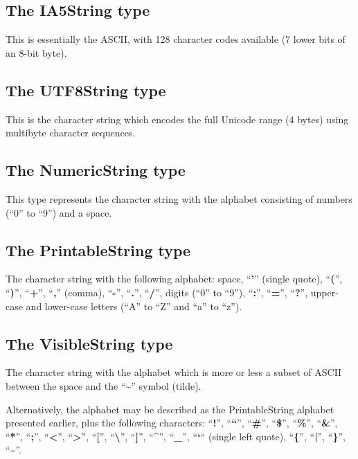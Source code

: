 \documentclass[english,oneside,12pt]{book}
\begin{document}
\subsection{The IA5String type}

This is essentially the ASCII, with 128 character codes available
(7 lower bits of an 8-bit byte).


\subsection{The UTF8String type}

This is the character string which encodes the full Unicode range
(4 bytes) using multibyte character sequences.


\subsection{The NumericString type}

This type represents the character string with the alphabet consisting
of numbers (``0'' to ``9'') and a space.


\subsection{The PrintableString type}

The character string with the following alphabet: space, ``\textbf{'}''
(single quote), ``\textbf{(}'', ``\textbf{)}'', ``\textbf{+}'',
``\textbf{,}'' (comma), ``\textbf{-}'', ``\textbf{.}'', ``\textbf{/}'',
digits (``0'' to ``9''), ``\textbf{:}'', ``\textbf{=}'', ``\textbf{?}'',
upper-case and lower-case letters (``A'' to ``Z'' and ``a''
to ``z'').


\subsection{The VisibleString type}

The character string with the alphabet which is more or less a subset
of ASCII between the space and the ``\textbf{\textasciitilde{}}''
symbol (tilde).

Alternatively, the alphabet may be described as the PrintableString
alphabet presented earlier, plus the following characters: ``\textbf{!}'',
``\textbf{``}'', ``\textbf{\#}'', ``\textbf{\$}'', ``\textbf{\%}'',
``\textbf{\&}'', ``\textbf{*}'', ``\textbf{;}'', ``\textbf{<}'',
``\textbf{>}'', ``\textbf{{[}}'', ``\textbf{\textbackslash{}}'',
``\textbf{{]}}'', ``\textbf{\textasciicircum{}}'', ``\textbf{\_}'',
``\textbf{`}`` (single left quote), ``\textbf{\{}'', ``\textbf{|}'',
``\textbf{\}}'', ``\textbf{\textasciitilde{}}''.
\end{document}
